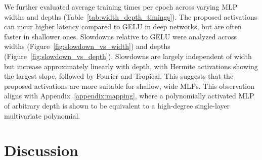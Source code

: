 \documentclass{article} %
\theoremstyle{plain}
\theoremstyle{definition}
\theoremstyle{remark}
\begin{document}
We further evaluated average training times per epoch across varying MLP widths and depths (Table~\ref{tab:width_depth_timings}). The proposed activations can incur higher latency compared to GELU in deep networks, but are often faster in shallower ones. Slowdowns relative to GELU were analyzed across widths (Figure~\ref{fig:slowdown_vs_width}) and depths (Figure~\ref{fig:slowdown_vs_depth}). Slowdowns are largely independent of width but increase approximately linearly with depth, with Hermite activations showing the largest slope, followed by Fourier and Tropical. This suggests that the proposed activations are more suitable for shallow, wide MLPs. This observation aligns with Appendix~\ref{appendix:mapping}, where a polynomially activated MLP of arbitrary depth is shown to be equivalent to a high-degree single-layer multivariate polynomial.



\section{Discussion}
\end{document}
